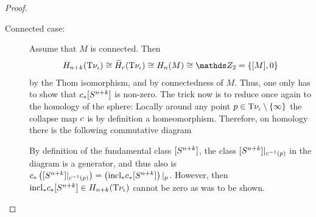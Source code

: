 \begin{Lem}
\begin{proof}
    \begin{description}
    \item[Connected case:]
      Assume that $M$ is connected.
      Then
      \begin{gather*}
        \H_{n+k}(\Thomspace{\N{\emb}})
        \cong\relH_r(\Thomspace{\N{\emb}})
        \cong \H_n(M) \cong \Zmod2=\{\fundcl M, 0\}
      \end{gather*}
      by the Thom isomorphism, and by connectedness of $M$.
      Thus, one only has to show that
      ${c}_*[S^{n+k}]$
      is non-zero.    
      The trick now is to reduce once again to the homology of the
      sphere:
      Locally around any point $p\in\mathrm{T}{\nu_{{\iota}}}\setminus\{\infty\}$ the
      collapse map $c$ is by definition a
      homeomorphism. Therefore, on homology there is the following 
      commutative diagram
      \begin{center}
      \end{center}
      By definition of the fundamental class $[S^{n+k}]$,
      the class $[S^{n+k}]|_{c^{-1}(p)}$ in the
      diagram is a generator, and thus also is
      ${c}_*\left([S^{n+k}]|_{c^{-1}(p)}\right)
      = \left({\mathrm{incl}}_*{c}_*[S^{n+k}]\right)|_p$.
      However, then ${\mathrm{incl}}_*{c}_*[S^{n+k}]\in
      H_{n+k}(\mathrm{T}{\nu_{{\iota}}})$
      cannot be zero as was to be shown.


\end{description}
\end{proof}
\end{Lem}
